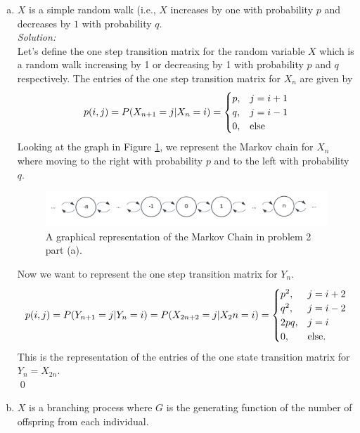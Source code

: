 \documentclass[10pt]{amsart}
\begin{document}
\begin{enumerate}[(a)]
\item $X$ is a simple random walk (i.e., $X$ increases by one with probability $p$ and decreases by $1$ with probability $q$. \\

\noindent
\textit{Solution:} \\
Let's define the one step transition matrix for the random variable $X$ which is a random walk increasing by 1 or decreasing by 1 with probability $p$ and $q$ respectively.
The entries of the one step transition matrix for $X_n$ are given by
$$
p(i, j) = P(X_{n + 1} = j | X_n = i) = \begin{cases}
p, & j = i + 1\\
q, & j = i - 1 \\
0, & {\rm else}
\end{cases}
$$
Looking at the graph in Figure \ref{fig:f4}, we represent the Markov chain for $X_n$ where moving to the right with probability $p$ and to the left with probability $q$.
\begin{figure}[h]
	\centering
	\includegraphics[scale=0.5]{two_part_a_markov_graph.png}
	\caption{
		A graphical representation of the Markov Chain in problem 2 part (a).
	}\label{fig:f4}
\end{figure}
Now we want to represent the one step transition matrix for $Y_n$.
\begin{align*}
p(i, j) = P(Y_{n + 1} = j | Y_n = i) 
= P(X_{2n + 2} = j | X_2n = i) = \begin{cases}
p^2, & j = i + 2\\
q^2, & j = i - 2 \\
2pq, & j = i \\
0, & {\rm else}.
\end{cases}
\end{align*}
This is the representation of the entries of the one state transition matrix for $Y_n = X_{2n}$. \\
\qed \\


\item $X$ is a branching process where $G$ is the generating function of the number of offspring from each individual. \\


\end{enumerate}
\end{document}
